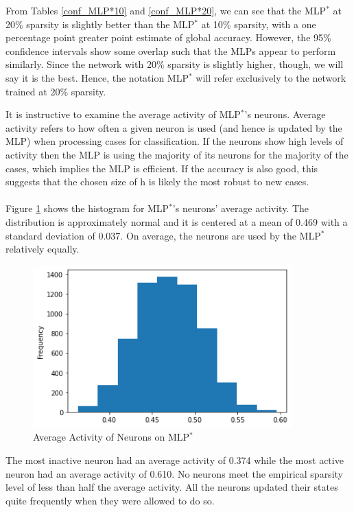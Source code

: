 \documentclass{homework}
\begin{document}
From Tables \ref{conf_MLP*10} and \ref{conf_MLP*20}, we can see that the MLP$^*$ at 20\% sparsity is slightly better than the MLP$^*$ at 10\% sparsity, with a one percentage point greater  point estimate of global accuracy. However, the 95\% confidence intervals show some overlap such that the MLPs appear to perform similarly. Since the network with 20\% sparsity is slightly higher, though, we will say it is the best. Hence, the notation MLP$^*$ will refer exclusively to the network trained at 20\% sparsity.

It is instructive to examine the average activity of MLP$^*$'s neurons. Average activity refers to how often a given neuron is used (and hence is updated by the MLP) when processing cases for classification. If the neurons show high levels of activity then the MLP is using the majority of its neurons for the majority of the cases, which implies the MLP is efficient. If the accuracy is also good, this suggests that the chosen size of h is likely the most robust to new cases.\\\\
Figure \ref{neurons} shows the histogram for MLP$^*$'s neurons' average activity. The distribution is approximately normal and it is centered at a mean of 0.469 with a standard deviation of 0.037. On average, the neurons are used by the MLP$^*$ relatively equally.

\begin{figure}[H]
    \centering
    \includegraphics[width=10cm]{mlp20_neurons.png}
    \caption{Average Activity of Neurons on MLP$^*$}
    \label{neurons}
\end{figure}

The most inactive neuron had an average activity of 0.374 while the most active neuron had an average activity of 0.610. No neurons meet the empirical sparsity level of less than half the average activity. All the neurons updated their states quite frequently when they were allowed to do so.
\end{document}
